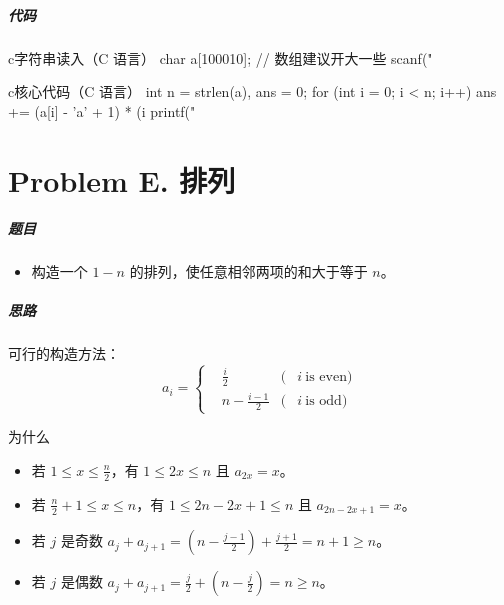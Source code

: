 \documentclass[
     aspectratio=169,                   %
]{beamer}
\begin{document}
\begin{frame}[fragile]
	\frametitle{代码}
	\begin{codeblock}{c}{字符串读入（C 语言）}
char a[100010]; // 数组建议开大一些
scanf("%
\end{codeblock}
	\begin{codeblock}{c}{核心代码（C 语言）}
int n = strlen(a), ans = 0;
for (int i = 0; i < n; i++) {
    ans += (a[i] - 'a' + 1) * (i %
}
printf("%
\end{codeblock}
\end{frame}


\part{Problem E. 排列}
\begin{frame}
	\frametitle{题目}
	\begin{itemize}
		\item 构造一个 $1-n$ 的排列，使任意相邻两项的和大于等于 $n$。
	\end{itemize}
\end{frame}

\begin{frame}
	\frametitle{思路}
	可行的构造方法：
	\begin{equation}
	a_i = \left\{\begin{aligned} &\frac{i}{2} 
	 &(&i \ \text{is even}) \\ &n-\frac{i-1}{2} 
	 &(&i \ \text{is odd})
	\end{aligned}\right.
	\end{equation}	
	\begin{block}{为什么}
		\begin{itemize}
			\item 若 $1 \leq x \leq \frac{n}{2}$，有 $1 \leq 2x \leq n$ 且 $a_{2x}=x$。
			\item 若 $\frac{n}{2}+1 \leq x \leq n$，有 $1 \leq 2n-2x+1 \leq n$ 且 $a_{2n-2x+1}=x$。
			\item 若 $j$ 是奇数 $a_j+a_{j+1}=(n-\frac{j-1}{2}) + \frac{j+1}{2} =n+1 \geq n$。
			\item 若 $j$ 是偶数 $a_j+a_{j+1}=\frac{j}{2} +(n-\frac{j}{2})  =n \geq n$。
		\end{itemize}
	\end{block}
\end{frame}
\end{document}
